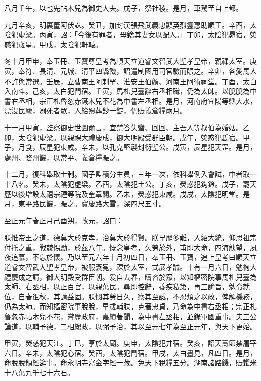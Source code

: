 \begin{pinyinscope}
 八月壬午，以也先帖木兒為御史大夫。戊子，祭社稷。是月，車駕至自上都。



 九月辛亥，明裏董阿伏誅。癸丑，加封漢張飛武義忠顯英烈靈惠助順王。辛酉，太陰犯虛梁。丙寅，詔：「今後有罪者，毋籍其妻女以配人。」丁卯，太陰犯昴宿，熒惑犯歲星。甲戌，太陰犯軒轅。



 冬十月甲申，奉玉冊、玉寶尊皇考為順天立道睿文智武大聖孝皇帝，親祼太室。庚寅，奉符、長清、元城、清平四縣饑，詔遣制國用司官驗而賑之。辛卯，各愛馬人不許與常選。壬辰，立曹南王阿剌罕、淮安王伯顏、河南王阿術祠堂。丁酉，太白入南斗。己亥，太白犯鬥宿。壬寅，馬札兒臺辭右丞相職，仍為太師。以脫脫為中書右丞相，宗正札魯忽赤鐵木兒不花為中書左丞相。是月，河南府宜陽等縣大水，漂沒民廬，溺死者眾，人給殯葬鈔一錠，仍賑義倉糧兩月。



 十一月甲寅，監察御史世圖爾言，宜禁答失蠻、回回、主吾人等叔伯為婚姻。乙卯，太陰犯虛梁。以親祼大禮慶成，御大明殿受群臣朝。戊午，熒惑犯氐宿。甲子，月食，辰星犯東咸。辛未，以孔克堅襲封衍聖公。戊寅，辰星犯天罡。是月，處州、婺州饑，以常平、義倉糧賑之。



 十二月，復科舉取士制。國子監積分生員，三年一次，依科舉例入會試，中者取一十八名。癸未，太陰犯虛梁。乙酉，太陰犯土公。丁亥，熒惑犯鉤鈐。戊子，罷天歷以後增設太禧宗禋等院及奎章閣。乙未，熒惑犯東咸。戊戌，太陰犯明堂。是月，東平路民饑，賑之。寶慶路大雪，深四尺五寸。



 至正元年春正月己酉朔，改元，詔曰：



 朕惟帝王之道，德莫大於克孝，治莫大於得賢。朕早歷多難，入紹大統，仰思祖宗付托之重，戰兢惕勵，於茲八年。慨念皇考，久勞於外，甫即大命，四海觖望，夙夜追慕，不忘於懷。乃以至元六年十月初四日，奉玉冊、玉寶，追上皇考曰順天立道睿文智武大聖孝皇帝，被服袞冕，祼於太室，式展孝誠。十有一月六日，勉徇大禮慶成之請，御大明殿受群臣朝。爰自去春，疇咨於眾，以知樞密院事馬札兒臺為太師、右丞相，以正百官，以親萬民。尋即控辭，養疾私第，再三諭旨，勉令就位，自春徂秋，其請益固。朕憫其勞日久，察其至誠，不忍煩之以政，俾解機務，仍為太師。而知樞密院事脫脫，早歲輔朕，克著忠貞，乃命為中書右丞相；宗正札魯忽赤帖木兒不花，嘗歷政府，嘉績著聞，為中書左丞相，並錄軍國重事。夫三公論道，以輔予德，二相總政，以弼予治，其以至元七年為至正元年，與天下更始。



 甲寅，熒惑犯天江。丁巳，享於太廟。庚申，太陰犯井宿。癸亥，詔天壽節禁屠宰六日。辛未，太陰犯心宿。癸酉，太陰犯鬥宿。甲戌，太白晝見，凡四日。是月，命脫脫領經筵事。命永明寺寫金字經一藏。免天下稅糧五分。湖南諸路饑，賑糶米十八萬九千七十六石。




\end{pinyinscope}
